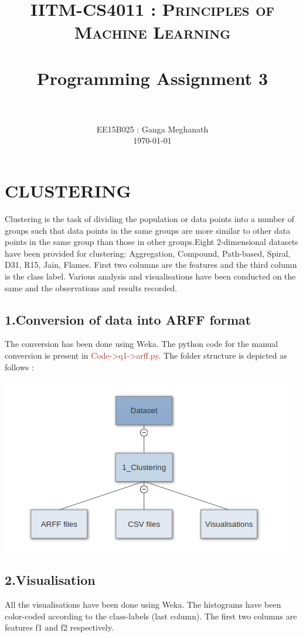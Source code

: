 \documentclass[paper=a4, fontsize=11pt]{scrartcl}
\title{
		\usefont{OT1}{bch}{b}{n}
		\normalfont \normalsize \textsc{IITM-CS4011 : Principles of Machine Learning} \\ [25pt]
		\horrule{0.5pt} \\[0.4cm]
		\huge Programming Assignment 3 \\
		\horrule{2pt} \\[0.5cm]
}
\author{
		\normalfont 								\normalsize
        EE15B025 : Ganga Meghanath\\[-3pt]		\normalsize
        \today
}
\date{}
\numberwithin{equation}{section}		%
\numberwithin{figure}{section}			%
\numberwithin{table}{section}				%
\begin{document}
\maketitle
\section*{CLUSTERING}
Clustering is the task of dividing the population or data points into a number of groups such that data points in the same groups are more similar to other data points in the same group than those in other groups.Eight 2-dimensional datasets have been provided for clustering: Aggregation, Compound, Path-based, Spiral, D31, R15, Jain, Flames. First two columns are the features and the third column is the class label. Various analysis and visualisations have been conducted on the same and the observations and results recorded.
\subsection*{1.Conversion of data into ARFF format}
The conversion has been done using Weka. The python code for the manual conversion is present in \textcolor{Brown}{Code->q1->arff.py}. The folder structure is depicted as follows :

\begin{center}
\includegraphics[scale=0.55]{Dataset_graph}
\end{center}

\subsection*{2.Visualisation}
All the visualisations have been done using Weka. The histograms have been color-coded according to the class-labels (last column). The first two columns are features f1 and f2 respectively.
\graphicspath{ {../Dataset/1_Clustering/Visualisations/} }
\end{document}
